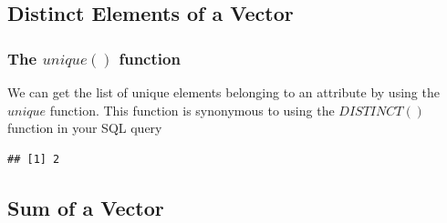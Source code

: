 \documentclass[12pt]{book}\usepackage{knitr}
\begin{document}
\subsection{Distinct Elements of a Vector}
\subsubsection{The $unique()$ function}
\noindent We can get the list of unique elements belonging to an attribute by using the $unique$ function. This function is synonymous to using the $DISTINCT()$ function in your SQL query  
\begin{knitrout}
\color{fgcolor}\begin{kframe}
\begin{alltt}
\hlkwb{<-} \hlstd{(}\hlstd{,}\hlstd{)} 
 
\end{alltt}
\begin{verbatim}
## [1] 2
\end{verbatim}
\end{kframe}
\end{knitrout}
\subsection{Sum of a Vector}
\end{document}
